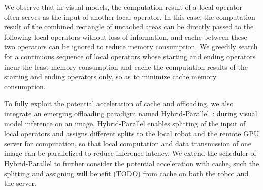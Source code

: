 We observe that in visual models, the computation result of a local operator often serves as the input of another local operator. 
In this case, the computation result of the combined rectangle of uncached areas can be directly passed to the following local operators without loss of information, and cache between these two operators can be ignored to reduce memory consumption.
We greedily search for a continuous sequence of local operators whose starting and ending operators incur the least memory consumption and cache the computation results of the starting and ending operators only, so as to minimize cache memory consumption.

To fully exploit the potential acceleration of cache and offloading, we also integrate an emerging offloading paradigm named Hybrid-Parallel~\cite{sun2024hybridparallel}: during visual model inference on an image, Hybrid-Parallel enables splitting of the input of local operators and assigns different splits to the local robot and the remote GPU server for computation, so that local computation and data transmission of one image can be parallelized to reduce inference latency.
We extend the scheduler of Hybrid-Parallel to further consider the potential acceleration with cache, such the splitting and assigning will benefit (TODO) from cache on both the robot and the server.



